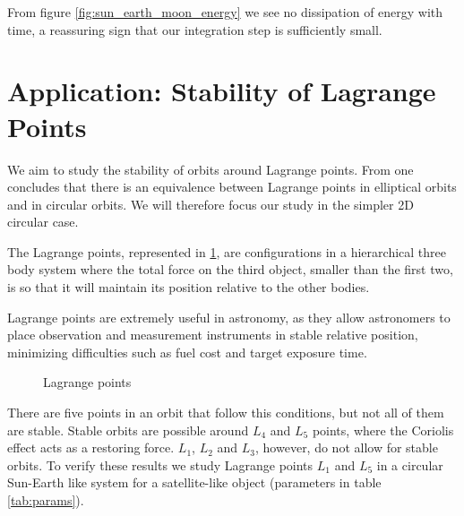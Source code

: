 \documentclass{aa}
\begin{document}
From figure \ref{fig:sun_earth_moon_energy} we see no dissipation of energy with
time, a reassuring sign that our integration step is sufficiently small.


\section{Application: Stability of Lagrange Points}

We aim to study the stability of orbits around Lagrange points. From \cite{todoran_elliptical_1992} one
concludes that there is an equivalence between Lagrange points in elliptical
orbits and in circular orbits. We will therefore focus our study in the simpler
2D circular case.

The Lagrange points, represented in \ref{fig:lagrange_points}, are
configurations in a hierarchical three body system where the total force on the third object,
smaller than the first two, is so that it will maintain its position relative to
the other bodies.

Lagrange points are extremely useful in astronomy, as they allow astronomers to
place observation and measurement instruments in stable relative
position, minimizing difficulties such as fuel cost and target exposure time.

\begin{figure}
  \centering
  \caption{Lagrange points}
  \label{fig:lagrange_points}
\end{figure}

There are five points in an orbit that follow this conditions, but not all of
them are stable. Stable orbits are possible around $L_4$ and $L_5$ points, where
the Coriolis effect acts as a restoring force. $L_1$, $L_2$ and $L_3$,
however, do not allow for stable orbits. To verify these results we study
Lagrange points $L_1$ and $L_5$ in a circular Sun-Earth like system for a
satellite-like object (parameters in table \ref{tab:params}).
\end{document}
